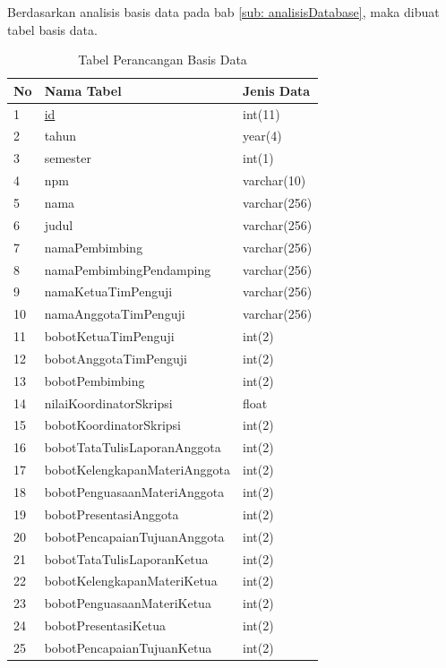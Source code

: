 	Berdasarkan analisis basis data pada bab \ref{sub: analisisDatabase}, maka dibuat tabel basis data.
	\begin{table}[H]
	\centering
	\caption{Tabel Perancangan Basis Data}
	\begin{tabular}{| m{0.75cm} | m{7cm} | m{3cm} |}
		\hline
		No & Nama Tabel & Jenis Data\\
		\hline
		1 & \underline{id} & int(11)\\
		\hline
		2 & tahun & year(4)\\
		\hline
		3 & semester & int(1)\\
		\hline
		4 & npm & varchar(10)\\
		\hline
		5 & nama & varchar(256)\\
		\hline
		6 & judul & varchar(256)\\
		\hline
		7 & namaPembimbing & varchar(256)\\
		\hline
		8 & namaPembimbingPendamping & varchar(256)\\
		\hline
		9 & namaKetuaTimPenguji & varchar(256)\\
		\hline
		10 & namaAnggotaTimPenguji & varchar(256)\\
		\hline
		11 & bobotKetuaTimPenguji & int(2)\\
		\hline
		12 & bobotAnggotaTimPenguji & int(2)\\
		\hline
		13 & bobotPembimbing & int(2)\\
		\hline
		14 & nilaiKoordinatorSkripsi & float\\
		\hline
		15 & bobotKoordinatorSkripsi & int(2)\\
		\hline
		16 & bobotTataTulisLaporanAnggota & int(2)\\
		\hline
		17 & bobotKelengkapanMateriAnggota & int(2)\\
		\hline
		18 & bobotPenguasaanMateriAnggota & int(2)\\
		\hline
		19 & bobotPresentasiAnggota & int(2)\\
		\hline
		20 & bobotPencapaianTujuanAnggota & int(2)\\
		\hline
		21 & bobotTataTulisLaporanKetua & int(2)\\
		\hline
		22 & bobotKelengkapanMateriKetua & int(2)\\
		\hline
		23 & bobotPenguasaanMateriKetua & int(2)\\
		\hline
		24 & bobotPresentasiKetua & int(2)\\
		\hline
		25 & bobotPencapaianTujuanKetua & int(2)\\
		\hline
	\end{tabular}
\end{table}
